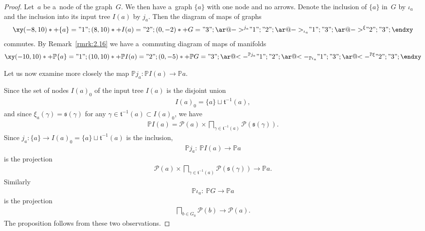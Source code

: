 \documentclass[pdftex]{sigma}
\numberwithin{equation}{section}
\begin{document}
\begin{proof}
Let~$a$ be a~node of the graph~$G$.
We then have a~graph $\{a\}$ with one node and no arrows.
Denote the inclusion of $\{a\}$ in~$G$ by $\iota_a$ and the inclusion into its input tree $I(a)$ by $j_a$.
Then the diagram of maps of graphs
\begin{gather*}
\xy
(-8, 10)*+{ \{a\}} ="1";
(8, 10)*+{ I(a)} ="2";
(0, -2)*+{G}="3";
{\ar@{->}^{ j_a} "1";"2"};
{\ar@{->}_{ \iota_a} "1";"3"};
{\ar@{->}^{\xi} "2";"3"};
\endxy
\end{gather*}
commutes.
By Remark~\ref{rmrk:2.16} we have a~commuting diagram of maps of manifolds
\begin{gather*}
\xy
(-10, 10)*+{ \mathbb{P}\{a\}} ="1";
(10, 10)*+{ \mathbb{P} I(a)} ="2";
(0, -5)*+{\mathbb{P} G}="3";
{\ar@{<-}^{ \mathbb{P} j_a} "1";"2"};
{\ar@{<-}_{ \mathbb{P} \iota_a} "1";"3"};
{\ar@{<-}^{\mathbb{P} \xi} "2";"3"};
\endxy
\end{gather*}

Let us now examine more closely the map $\mathbb{P} j_a\colon \mathbb{P} I(a)\to \mathbb{P} a$.

Since the set of nodes $I(a)_0$ of the input tree $I(a)$ is the disjoint union
\begin{gather*}
I(a)_0 = \{a\} \sqcup \mathfrak t^{-1} (a),
\end{gather*}
and since $\xi_a (\gamma) = \mathfrak s (\gamma)$ for any $\gamma \in \mathfrak t^{-1} (a) \subset I(a)_0$, we have
\begin{gather*}
\mathbb{P} I(a) = {\mathcal P}(a) \times \bigsqcap_{\gamma \in \mathfrak t^{-1} (a)} {\mathcal P} (\mathfrak s(\gamma)).
\end{gather*}
Since $j_a\colon \{a\} \to I(a)_0 = \{a\} \sqcup \mathfrak t^{-1} (a)$ is the inclusion,
\begin{gather*}
\mathbb{P} j_a \colon \ \mathbb{P} I(a) \to \mathbb{P} a
\end{gather*}
is the projection
\begin{gather*}
{\mathcal P}(a) \times \bigsqcap_{\gamma \in \mathfrak t^{-1} (a)} {\mathcal P} (\mathfrak s(\gamma)) \to \mathbb{P} a.
\end{gather*}
Similarly
\begin{gather*}
\mathbb{P} \iota_a\colon \ \mathbb{P} G \to \mathbb{P} a
\end{gather*}
is the projection
\begin{gather*}
\bigsqcap_{b\in G_0} {\mathcal P} (b) \to {\mathcal P}(a).
\end{gather*}
The proposition follows from these two observations.
\end{proof}
\end{document}
